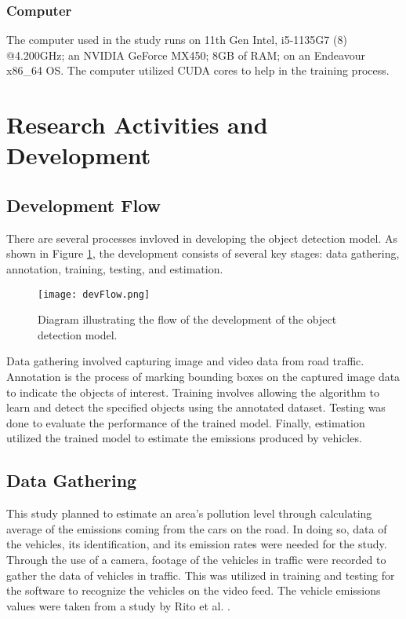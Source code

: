 \subsubsection{Computer}
The computer used in the study runs on 11th Gen Intel, i5-1135G7 (8) @4.200GHz; an NVIDIA GeForce MX450; 8GB of RAM; on an Endeavour x86\_64 OS. The computer utilized CUDA cores to help in the training process.

\section{Research Activities and Development}

\subsection{Development Flow}
There are several processes invloved in developing the object detection model. As shown in Figure \ref{fig:devFlow}, the development consists of several key stages: data gathering, annotation, training, testing, and estimation.

\begin{figure}[!htbp]
	\texttt{[image: devFlow.png]}
	\caption{Diagram illustrating the flow of the development of the object detection model.}
	\label{fig:devFlow}
\end{figure}
\FloatBarrier

Data gathering involved capturing image and video data from road traffic. Annotation is the process of marking bounding boxes on the captured image data to indicate the objects of interest. Training involves allowing the algorithm to learn and detect the specified objects using the annotated dataset. Testing was done to evaluate the performance of the trained model. Finally, estimation utilized the trained model to estimate the emissions produced by vehicles.


\subsection {Data Gathering}
This study planned to estimate an area’s pollution level through calculating average of the emissions coming from the cars on the road. In doing so, data of the vehicles, its identification, and its emission rates were needed for the study. Through the use of a camera, footage of the vehicles in traffic were recorded to gather the data of vehicles in traffic. This was utilized in training and testing for the software to recognize the vehicles on the video feed. The vehicle emissions values were taken from a study by Rito et al. \citeyear{rito_lopez_biona_2021}.

